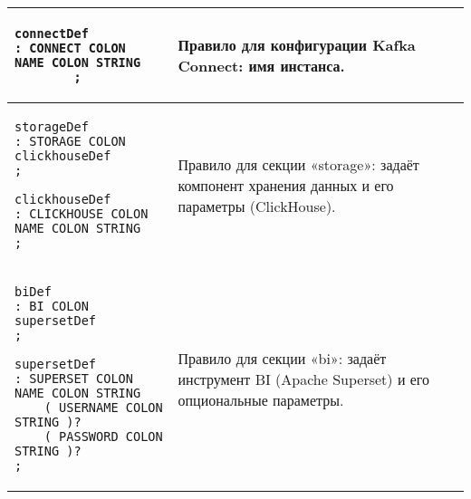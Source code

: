 \begin{longtable}{|p{3in}|p{3in}|}
    \begin{minipage}{3in}
        \begin{verbatim}
connectDef
: CONNECT COLON 
NAME COLON STRING
        ;
    \end{verbatim}
    \end{minipage}
                                 &
    \begin{minipage}{2.6in}
        Правило для конфигурации Kafka Connect: имя инстанса.
    \end{minipage}
    \\ \hline

    \begin{minipage}{3in}
        \begin{verbatim}
storageDef
: STORAGE COLON 
clickhouseDef
;

clickhouseDef
: CLICKHOUSE COLON 
NAME COLON STRING
;
    \end{verbatim}
    \end{minipage}
                                 &
    \begin{minipage}{2.6in}
        Правило для секции «storage»: задаёт компонент хранения данных и его параметры (ClickHouse).
    \end{minipage}
    \\ \hline

    \begin{minipage}{3in}
        \begin{verbatim}
biDef
: BI COLON supersetDef
;

supersetDef
: SUPERSET COLON NAME COLON STRING
    ( USERNAME COLON STRING )?
    ( PASSWORD COLON STRING )?
;
    \end{verbatim}
    \end{minipage}
                                 &
    \begin{minipage}{2.6in}
        Правило для секции «bi»: задаёт инструмент BI (Apache Superset) и его опциональные параметры.
    \end{minipage}
    \\ \hline


\end{longtable}
